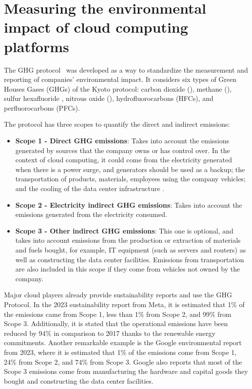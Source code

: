 \section{Measuring the environmental impact of cloud computing platforms}

\label{sec:measuring_environmental_impact}


The GHG protocol~\cite{ghgprotocol2004} was developed as a way to standardize the measurement and reporting of companies' environmental impact. It considers six types of Green Houses Gases (GHGs) of the Kyoto protocol: carbon dioxide (), methane (), sulfur hexafluoride , nitrous oxide (), hydrofluorocarbons (HFCs), and perfluorocarbons (PFCs).


The protocol has three scopes to quantify the direct and indirect emissions:

\begin{itemize}
\item \textbf{Scope 1 - Direct GHG emissions}: Takes into account the emissions generated by sources that the company owns or has control over. In the context of cloud computing, it could come from the electricity generated when there is a power surge, and generators should be used as a backup; the transportation of products, materials, employees using the company vehicles; and the cooling of the data center infrastructure \cite{gupta2021_chasingcarbon}.
\item \textbf{Scope 2 - Electricity indirect GHG emissions}: Takes into account the emissions generated from the electricity consumed.
\item \textbf{Scope 3 - Other indirect GHG emissions}: This one is optional, and takes into account emissions from the production or extraction of materials and fuels bought, for example, IT equipment (such as servers and routers) as well as constructing the data center facilities. Emissions from transportation are also included in this scope if they come from vehicles not owned by the company.
\end{itemize}  

Major cloud players already provide sustainability reports and use the GHG Protocol. In the 2023 sustainability report from Meta\cite{meta_sustainability_report_2023}, it is estimated that 1\% of the emissions came from Scope 1, less than 1\% from Scope 2, and 99\% from Scope 3. Additionally, it is stated that the operational emissions have been reduced by 94\% in comparison to 2017 thanks to the renewable energy commitments. Another remarkable example is the Google environmental report from 2023\cite{google_sustainability_report_2023}, where it is estimated that 1\% of the emissions come from Scope 1, 24\% from Scope 2, and 74\% from Scope 3. Google also reports that most of the Scope 3 emissions come from manufacturing the hardware and capital goods they bought and constructing the data center facilities.


